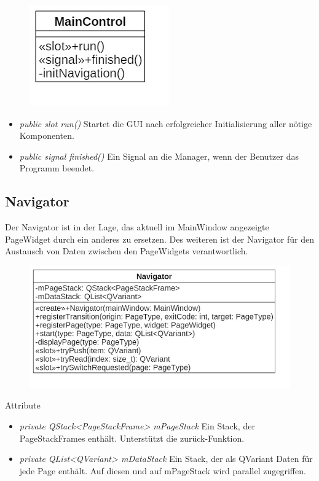\begin{figure}[H]
\centering
\includegraphics[scale=0.5]{img/Klassendiagramm/Klassen/Controller/MainControl}
\label{fig:mainControl}
\end{figure}

\begin{itemize}
	\item\textit{public slot run()}
	Startet die GUI nach erfolgreicher Initialisierung aller nötige Komponenten.
	\item\textit{public signal finished()}
	Ein Signal an die Manager, wenn der Benutzer das Programm beendet.
\end{itemize}

\subsection*{Navigator}
Der Navigator ist in der Lage, das aktuell im MainWindow angezeigte PageWidget durch ein anderes zu ersetzen. Des weiteren ist der Navigator für den Austausch von Daten zwischen den PageWidgets verantwortlich.

\begin{figure}[H]
\centering
\includegraphics[scale=0.5]{img/Klassendiagramm/Klassen/Controller/Navigator}
\label{fig:navigator}
\end{figure}

\pagebreak

Attribute
\begin{itemize}
	\item\textit{private QStack<PageStackFrame> mPageStack}
	Ein Stack, der PageStackFrames enthält. Unterstützt die zurück-Funktion.
	\item\textit{private QList<QVariant> mDataStack}
	Ein Stack, der als QVariant Daten für jede Page enthält. Auf diesen und auf mPageStack wird parallel zugegriffen.

\end{itemize}


